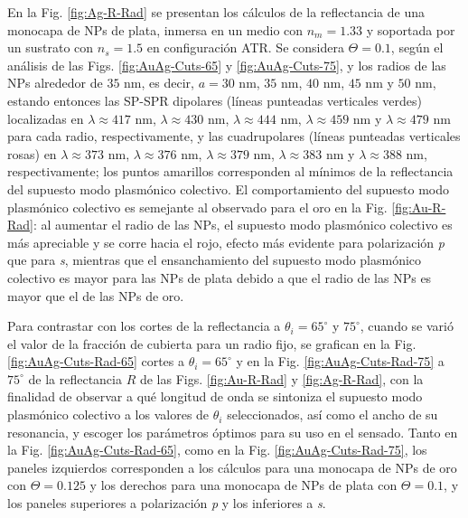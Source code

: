 En la Fig. \ref{fig:Ag-R-Rad}	 se presentan los cálculos de la reflectancia de una monocapa de NPs  de plata, inmersa en un medio con $n_m=1.33$ y soportada por un sustrato con $n_s=1.5$ en configuración ATR. Se considera  $\Theta=0.1$,  según el análisis de las Figs. \ref{fig:AuAg-Cuts-65} y \ref{fig:AuAg-Cuts-75}, y los radios de las NPs alrededor de $35$ nm, es decir, $a=30$ nm, $35$ nm, $40$ nm, $45$ nm y $50$ nm, estando entonces las SP-SPR dipolares (líneas punteadas verticales verdes) localizadas en $\lambda\approx 417$ nm, $\lambda\approx 430$ nm, $\lambda\approx 444$ nm, $\lambda\approx 459$ nm y $\lambda\approx 479$ nm para cada radio, respectivamente, y las cuadrupolares (líneas punteadas verticales rosas) en $\lambda\approx 373$ nm, $\lambda\approx 376$ nm, $\lambda\approx 379$ nm, $\lambda\approx 383$ nm y $\lambda\approx 388$ nm, respectivamente; los puntos amarillos corresponden al mínimos de la reflectancia del supuesto modo plasmónico colectivo. El comportamiento del supuesto modo plasmónico colectivo es semejante al observado para el oro en la Fig. \ref{fig:Au-R-Rad}: al aumentar el radio de las NPs, el supuesto modo plasmónico colectivo es más apreciable y se corre hacia el rojo, efecto más evidente para polarización \emph{p} que para \emph{s}, mientras que el ensanchamiento del supuesto modo plasmónico colectivo es mayor para las NPs de plata debido a que el radio de las NPs es mayor que el de las NPs de oro.

Para contrastar con los cortes de la reflectancia a $\theta_i=65^\circ$ y $75^\circ$, cuando se varió el valor de la fracción de cubierta para un radio fijo, se grafican en la Fig. \ref{fig:AuAg-Cuts-Rad-65} cortes a $\theta_i = 65^\circ$  y en la  Fig.  \ref{fig:AuAg-Cuts-Rad-75} a $75^\circ$ de la reflectancia $R$ de las Figs. \ref{fig:Au-R-Rad} y \ref{fig:Ag-R-Rad}, con la finalidad de observar a qué longitud de onda se sintoniza el supuesto modo plasmónico colectivo a los valores de $\theta_i$ seleccionados, así como el ancho de su resonancia, y escoger los parámetros óptimos para su uso en el sensado. Tanto en la Fig. \ref{fig:AuAg-Cuts-Rad-65}, como en la Fig. \ref{fig:AuAg-Cuts-Rad-75}, los paneles izquierdos corresponden a los cálculos para una monocapa de NPs de oro con $\Theta=0.125$ y los derechos para una monocapa de NPs de plata con $\Theta=0.1$, y los paneles superiores a polarización \emph{p} y los inferiores a \emph{s}.

